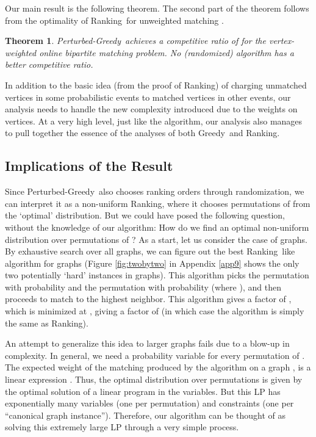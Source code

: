 \documentclass[11pt]{article}
\newtheorem{theorem}{Theorem}
\newcommand{\greedy}{{\sc Greedy}}
\newcommand{\ranking}{{\sc Ranking}}
\newcommand{\pgreedy}{{\sc Perturbed-Greedy}}
\begin{document}
Our main result is the following theorem. The second part of
the theorem follows from the optimality of \ranking~for unweighted
matching \cite{KVV90}.
\begin{theorem}
\label{thm:main}
\pgreedy~achieves a competitive ratio of  for the
vertex-weighted online bipartite matching problem. No (randomized)
algorithm has a better competitive ratio.
\end{theorem}

In addition to the basic idea (from the proof of \ranking) of charging
unmatched vertices in some probabilistic events to matched vertices in
other events, our analysis needs to handle the new complexity
introduced due to the weights on vertices. At a very high level, just
like the algorithm, our analysis also manages to pull together the
essence of the analyses of both \greedy~and \ranking.

\subsection{Implications of the Result}
\label{sec:implications}

 Since \pgreedy~also chooses ranking orders through
randomization, we can interpret it as a non-uniform \ranking, where it
chooses permutations of  from the `optimal' distribution. But we
could have posed the following question, without the knowledge of our
algorithm: How do we find an optimal non-uniform distribution over
permutations of ? As a start, let us consider the case of  graphs. By exhaustive search over all  graphs, we can
figure out the best \ranking~like algorithm for  graphs
(Figure \ref{fig:twobytwo} in Appendix \ref{app9} shows the only two
potentially `hard' instances in  graphs). This algorithm
picks the permutation  with probability
 and the permutation  with
probability  (where ), and then proceeds to match to the highest neighbor. This
algorithm gives a factor of , which is minimized at , giving a factor of 
(in which case the algorithm is simply the same as \ranking).

An attempt to generalize this idea to larger graphs fails due to a
blow-up in complexity.  In general, we need a probability variable
 for every permutation  of . The expected weight
of the matching produced by the algorithm on a graph , is a linear
expression . Thus,
the optimal distribution over permutations is given by the optimal
solution of a linear program in the  variables. But this LP
has exponentially many variables (one per permutation) and constraints
(one per ``canonical graph instance''). Therefore, our algorithm can
be thought of as solving this extremely large LP through a very simple
process.\\
\end{document}
